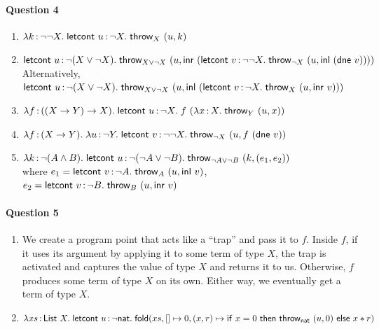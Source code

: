 \documentclass[11pt,a4paper,twoside]{article}
\begin{document}
\paragraph*{Question 4}
\begin{enumerate}[label=(\alph*)]
  \item $\lambda k \,{:}\, \neg \neg X .\; \mathsf{letcont}\ u \,{:}\, \neg X. \; \mathsf{throw}_{X}\ (u,k)$
  \item $\letcont{u}{\neg(X \lor \neg X)}{\throw{X \lor \neg X}{
    (u, \inr\ (\letcont{v}{\neg \neg X}{\throw{\neg X}{(u, \inl\ (\mathsf{dne}\ v))}}))
    }}$\\
    Alternatively, 
    $\mathsf{letcont}\ u \,{:}\, \neg(X \lor \neg X). \; \mathsf{throw}_{X \lor \neg X}\ 
      (u, \mathsf{inl}\ (\mathsf{letcont}\ v \,{:}\, \neg X. \; \mathsf{throw}_{X}\ (u, \mathsf{inr}\ v)))
   $
  \item $\lambda f \,{:}\, ((X \to Y) \to X) .\; \mathsf{letcont}\ u \,{:}\, \neg X. \; f\ (\lambda x \,{:}\, X .\; \mathsf{throw}_{Y}\ (u, x))$
  \item $\lambda f \,{:}\, (X \to Y) .\; \lambda u \,{:}\, \neg Y .\; \mathsf{letcont}\ v \,{:}\, \neg\neg X. \; 
    \mathsf{throw}_{\neg X}\ (u, f\ (\mathsf{dne}\ v))$
  \item $\lambda k \,{:}\, \neg(A \land B) .\; \mathsf{letcont}\ u \,{:}\, \neg(\neg A \lor \neg B). \; 
    \mathsf{throw}_{\neg A \lor \neg B}\ (k, (e_1, e_2))
 $\\
    where $e_1 = \mathsf{letcont}\ v \,{:}\, \neg A. \; \mathsf{throw}_{A}\ (u, \mathsf{inl}\ v)$,
    $e_2 = \mathsf{letcont}\ v \,{:}\, \neg B. \; \mathsf{throw}_{B}\ (u, \mathsf{inr}\ v)$
\end{enumerate}

\paragraph*{Question 5}
\begin{enumerate}[label=(\alph*)]
  \item We create a program point that acts like a ``trap'' and pass it to $f$.
    Inside $f$, if it uses its argument by applying it to some term of type $X$, 
    the trap is activated and captures the value of type $X$ and returns it to us. 
    Otherwise, $f$ produces some term of type $X$ on its own. 
    Either way, we eventually get a term of type $X$.
  \item $\lambda xs \,{:}\, \mathsf{List}\ X .\; \mathsf{letcont}\ u \,{:}\, \neg\mathsf{nat}. \; \mathsf{fold}(xs, \mathsf{[]} \mapsto 0, (x, r) \mapsto \mathsf{if}\ x = 0 \ \mathsf{then}\ \mathsf{throw}_{\mathsf{nat}}\ (u, 0) \ \mathsf{else}\ x * r)$ 
\end{enumerate}
\end{document}
